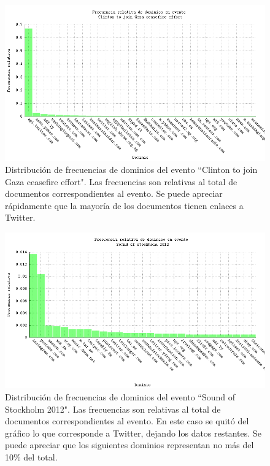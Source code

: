 \documentclass[upright, contnum]{umemoria}
\begin{document}
\begin{figure}[h]
  \centering
  \includegraphics[width=14cm]{./img/clinton-domain-freqs.png}
  \caption[Dominios evento 2]
   {Distribución de frecuencias de dominios del evento ``Clinton to
  join Gaza ceasefire effort"\label{fig:clinton-domains}. Las frecuencias son relativas al total de
  documentos correspondientes al evento. Se puede apreciar rápidamente
  que la mayoría de los documentos tienen enlaces a Twitter.}
\end{figure}

\begin{figure}[h]
  \centering
  \includegraphics[width=14cm]{./img/stockholm-domain-freqs.png}
  \caption[Dominios evento 3]
   {Distribución de frecuencias de dominios del evento ``Sound of
  Stockholm 2012"\label{fig:stockholm-domains}. Las frecuencias son relativas al total de
  documentos correspondientes al evento. En este caso se quitó del
  gráfico lo que corresponde a Twitter, dejando los datos
  restantes. Se puede apreciar que los siguientes dominios representan
  no más del 10\% del total.}
\end{figure}
\end{document}
